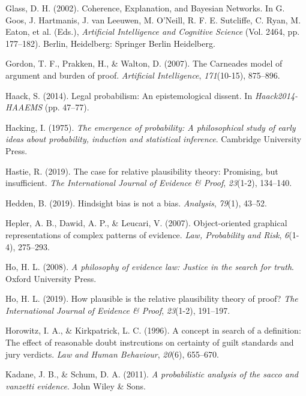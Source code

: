 \documentclass[11pt,dvipsnames,enabledeprecatedfontcommands]{scrartcl}
\begin{document}
\hypertarget{ref-glass2002}{}
Glass, D. H. (2002). Coherence, Explanation, and Bayesian Networks. In
G. Goos, J. Hartmanis, J. van Leeuwen, M. O'Neill, R. F. E. Sutcliffe,
C. Ryan, M. Eaton, et al. (Eds.), \emph{Artificial Intelligence and
Cognitive Science} (Vol. 2464, pp. 177--182). Berlin, Heidelberg:
Springer Berlin Heidelberg.

\hypertarget{ref-gordon2007}{}
Gordon, T. F., Prakken, H., \& Walton, D. (2007). The Carneades model of
argument and burden of proof. \emph{Artificial Intelligence},
\emph{171}(10-15), 875--896.

\hypertarget{ref-haack2011legal}{}
Haack, S. (2014). Legal probabilism: An epistemological dissent. In
\emph{Haack2014-HAAEMS} (pp. 47--77).

\hypertarget{ref-Hacking1984}{}
Hacking, I. (1975). \emph{The emergence of probability: A philosophical
study of early ideas about probability, induction and statistical
inference}. Cambridge University Press.

\hypertarget{ref-hastie2019CaseRelativePlausibilitya}{}
Hastie, R. (2019). The case for relative plausibility theory: Promising,
but insufficient. \emph{The International Journal of Evidence \& Proof},
\emph{23}(1-2), 134--140.

\hypertarget{ref-hedden2019}{}
Hedden, B. (2019). Hindsight bias is not a bias. \emph{Analysis},
\emph{79}(1), 43--52.

\hypertarget{ref-hepler2007ObjectorientedGraphicalRepresentations}{}
Hepler, A. B., Dawid, A. P., \& Leucari, V. (2007). Object-oriented
graphical representations of complex patterns of evidence. \emph{Law,
Probability and Risk}, \emph{6}(1-4), 275--293.

\hypertarget{ref-ho2008philosophy}{}
Ho, H. L. (2008). \emph{A philosophy of evidence law: Justice in the
search for truth}. Oxford University Press.

\hypertarget{ref-lai2019HowPlausibleRelative}{}
Ho, H. L. (2019). How plausible is the relative plausibility theory of
proof? \emph{The International Journal of Evidence \& Proof},
\emph{23}(1-2), 191--197.

\hypertarget{ref-Horowitz1996}{}
Horowitz, I. A., \& Kirkpatrick, L. C. (1996). A concept in search of a
definition: The effect of reasonable doubt instrcutions on certainty of
guilt standards and jury verdicts. \emph{Law and Human Behaviour},
\emph{20}(6), 655--670.

\hypertarget{ref-kadane2011probabilistic}{}
Kadane, J. B., \& Schum, D. A. (2011). \emph{A probabilistic analysis of
the sacco and vanzetti evidence}. John Wiley \& Sons.
\end{document}
